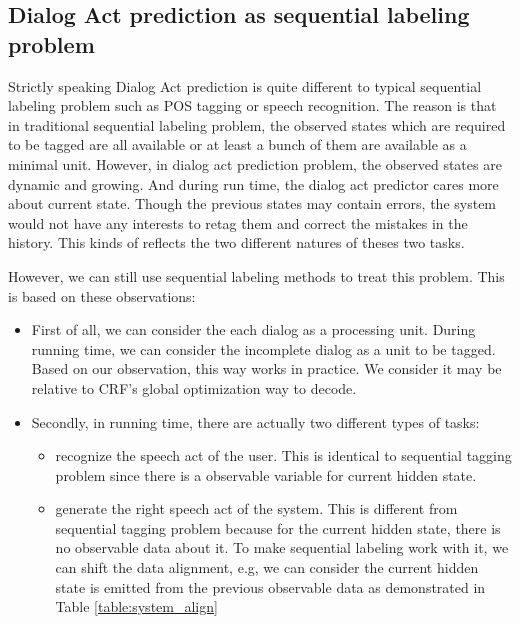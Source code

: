 \documentclass[a4paper]{article}
\begin{document}
\subsection{Dialog Act prediction as sequential labeling problem}
Strictly speaking Dialog Act prediction is quite different to typical sequential labeling problem such as POS tagging or speech recognition. The reason is that in traditional sequential labeling problem, the observed states which are required to be tagged are all available or at least a bunch of them are available as a minimal unit. However, in dialog act prediction problem, the observed states are dynamic and growing. And during run time, the dialog act predictor cares more about current state. Though the previous states may contain errors, the system would not have any interests to retag them and correct the mistakes in the history. This kinds of reflects the two different natures of theses two tasks.

However, we can still use sequential labeling methods to treat this problem. This is based on these observations:
\begin{itemize}
    \item First of all, we can consider the each dialog as a processing unit. During running time, we can consider the incomplete dialog as a unit to be tagged. Based on our observation, this way works in practice. We consider it may be relative to CRF's global optimization way to decode. 
    \item Secondly, in running time, there are actually two different types of tasks:
        \begin{itemize}
            \item recognize the speech act of the user. This is identical to sequential tagging problem since there is a observable variable for current hidden state.
            \item generate the right speech act of the system. This is different from sequential tagging problem because for the current hidden state, there is no observable data about it. To make sequential labeling work with it, we can shift the data alignment, e.g, we can consider the current hidden state is emitted from the previous observable data as demonstrated in Table \ref{table:system_align} 
        \end{itemize}
\end{itemize}
\end{document}
